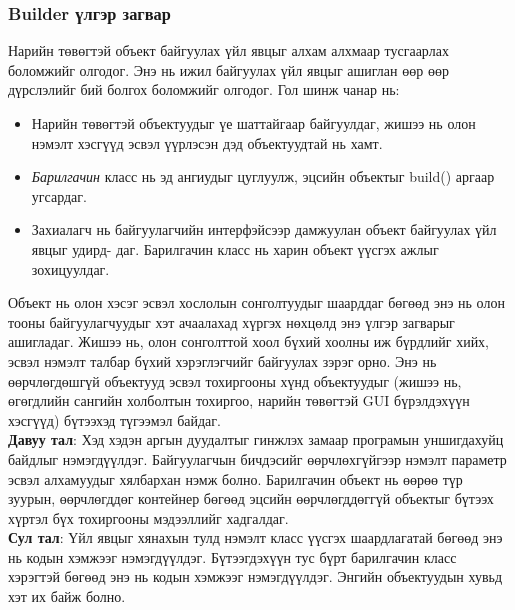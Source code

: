 \subsubsection{Builder үлгэр загвар}
\quad \quad Нарийн төвөгтэй объект байгуулах үйл явцыг алхам алхмаар тусгаарлах боломжийг олгодог. Энэ нь ижил байгуулах үйл явцыг ашиглан өөр өөр дүрслэлийг бий болгох боломжийг олгодог. Гол шинж чанар нь:
\begin{itemize}
	\item Нарийн төвөгтэй объектуудыг үе шаттайгаар байгуулдаг, жишээ нь олон нэмэлт хэсгүүд эсвэл үүрлэсэн дэд объектуудтай нь хамт.
	\item \textit{Барилгачин} класс нь эд ангиудыг цуглуулж, эцсийн объектыг build() аргаар угсардаг.
	\item Захиалагч нь байгуулагчийн интерфэйсээр дамжуулан объект байгуулах үйл явцыг удирд- даг. Барилгачин класс нь харин объект үүсгэх ажлыг зохицуулдаг.
\end{itemize}
Объект нь олон хэсэг эсвэл хослолын сонголтуудыг шаарддаг бөгөөд энэ нь олон тооны байгуулагчуудыг хэт ачаалахад хүргэх нөхцөлд энэ үлгэр загварыг ашигладаг. Жишээ нь, олон сонголттой хоол бүхий хоолны иж бүрдлийг хийх, эсвэл нэмэлт талбар бүхий хэрэглэгчийг байгуулах зэрэг орно. Энэ нь өөрчлөгдөшгүй объектууд эсвэл тохиргооны хүнд объектуудыг (жишээ нь, өгөгдлийн сангийн холболтын тохиргоо, нарийн төвөгтэй GUI бүрэлдэхүүн хэсгүүд) бүтээхэд түгээмэл байдаг.\\
\textbf{Давуу тал}: Хэд хэдэн аргын дуудалтыг гинжлэх замаар програмын уншигдахуйц байдлыг нэмэгдүүлдэг. Байгуулагчын бичдэсийг өөрчлөхгүйгээр нэмэлт параметр эсвэл алхамуудыг хялбархан нэмж болно. Барилгачин объект нь өөрөө түр зуурын, өөрчлөгддөг контейнер бөгөөд эцсийн өөрчлөгддөггүй объектыг бүтээх хүртэл бүх тохиргооны мэдээллийг хадгалдаг.\\
\textbf{Сул тал}: Үйл явцыг хянахын тулд нэмэлт класс үүсгэх шаардлагатай бөгөөд энэ нь кодын хэмжээг нэмэгдүүлдэг.	Бүтээгдэхүүн тус бүрт барилгачин класс хэрэгтэй бөгөөд энэ нь кодын хэмжээг нэмэгдүүлдэг. Энгийн объектуудын хувьд хэт их байж болно.


